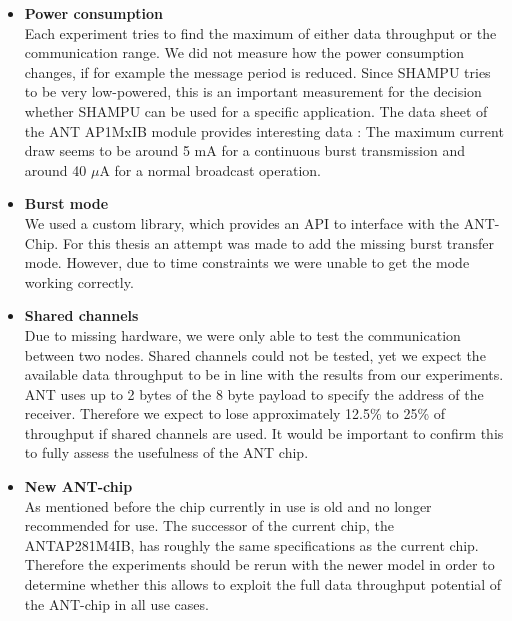 \begin{itemize}
	\item{\textbf{Power consumption}} \hfill \\ Each experiment tries to find the maximum of either data throughput or the communication range. We did not measure how the power consumption changes, if for example the message period is reduced. Since SHAMPU tries to be very low-powered, this is an important measurement for the decision whether SHAMPU can be used for a specific application. The data sheet of the ANT AP1MxIB module provides interesting data \cite{Networks}: The maximum current draw seems to be around 5 mA for a continuous burst transmission and around 40 $\mu$A for a normal broadcast operation.
	
	\item{\textbf{Burst mode}} \hfill \\ We used a custom library, which provides an API to interface with the ANT-Chip. For this thesis an attempt was made to add the missing burst transfer mode. However, due to time constraints we were unable to get the mode working correctly. 
	
	\item{\textbf{Shared channels}} \hfill \\ Due to missing hardware, we were only able to test the communication between two nodes. Shared channels could not be tested, yet we expect the available data throughput to be in line with the results from our experiments. ANT uses up to 2 bytes of the 8 byte payload to specify the address of the receiver. Therefore we expect to lose approximately 12.5\% to 25\% of throughput if shared channels are used. It would be important to confirm this to fully assess the usefulness of the ANT chip.
	
	\item{\textbf{New ANT-chip}} \hfill \\ As mentioned before the chip currently in use is old and no longer recommended for use. The successor of the current chip, the ANTAP281M4IB, has roughly the same specifications as the current chip. Therefore the experiments should be rerun with the newer model in order to determine whether this allows to exploit the full data throughput potential of the ANT-chip in all use cases.
\end{itemize}
